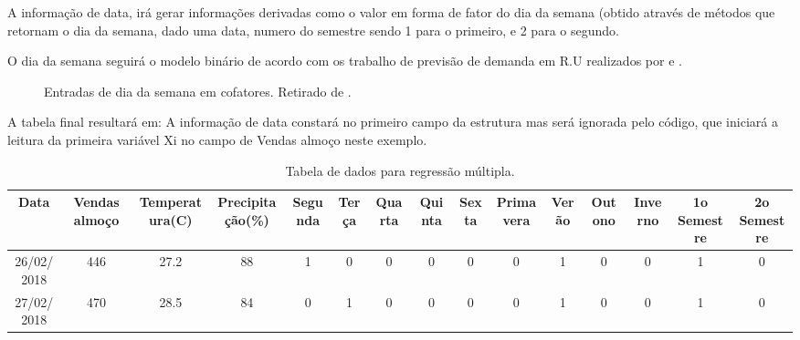 \documentclass[	12pt, Times, openright, twoside, a4paper, english, brazil]{abntex2}
\begin{document}
A informação de data, irá gerar informações derivadas como o valor em forma de fator do dia da semana (obtido através de métodos que retornam o dia da semana, dado uma data, numero do semestre sendo 1 para o primeiro, e 2 para o segundo.

O dia da semana seguirá o modelo binário de acordo com os trabalho de previsão de demanda em R.U realizados por \cite{Lopes2008} e \cite{Rocha2011}.

\begin{figure}[!ht]
	\caption{Entradas de dia da semana em cofatores. Retirado de \cite{Lopes2008}.\label{fig:entradasSemanais}}
\end{figure}

A tabela final resultará em:
A informação de data constará no primeiro campo da estrutura mas será ignorada pelo código, que iniciará a leitura da primeira variável Xi no campo de Vendas almoço neste exemplo.

\begin{table}[!ht]
	\centering
		\caption{Tabela de dados para regressão múltipla.}	\label{tab:regressaoMultipla}
		\begin{tabular}{|c|c|c|c|c|c|c|c|c|c|c|c|c|c|c}
			\hline  \textbf{Data} &	\textbf{Vendas almoço} & \textbf{Temperatura(C)} & \textbf{Precipitação(\%)} & \textbf{Segunda} & \textbf{Terça} & \textbf{Quarta} &\textbf{Quinta} & \textbf{Sexta} & \textbf{Primavera} & \textbf{Verão} & \textbf{Outono} & \textbf{Inverno} & \textbf{1o Semestre} & \textbf{2o Semestre}\\
			\hline 26/02/2018 & 446	& 27.2	& 88 & 1 & 0 & 0 & 0 & 0 & 0 & 1 & 0 & 0 & 1 & 0\\
			\hline 27/02/2018 & 470	& 28.5	& 84 & 0 & 1 & 0 & 0 & 0 & 0 & 1 & 0 & 0 & 1 & 0\\
		\end{tabular}
\end{table}
\end{document}
